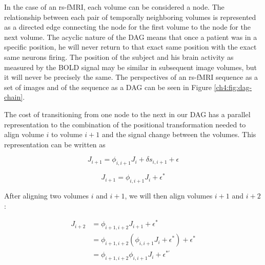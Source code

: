 In the case of an rs-fMRI, each volume can be considered a node. The relationship between each pair of temporally neighboring volumes is represented as a directed edge connecting the node for the first volume to the node for the next volume. The acyclic nature of the DAG means that once a patient was in a specific position, he will never return to that exact same position with the exact same neurons firing. The position of the subject and his brain activity as measured by the BOLD signal may be similar in subsequent image volumes, but it will never be precisely the same. The perspectives of an rs-fMRI sequence as a set of images and of the sequence as a DAG can be seen in Figure \ref{ch4:fig:dag-chain}.

The cost of transitioning from one node to the next in our DAG has a parallel representation to the combination of the positional transformation needed to align volume $i$ to volume $i+1$ and the signal change between the volumes. This representation can be written as 

\begin{equation}
J_{i+1} = \phi_{i,i+1} J_i + \delta s_{i,i+1} + \epsilon
\end{equation}


\begin{equation}
J_{i+1} = \phi_{i,i+1} J_i + \epsilon^*
\end{equation}


After aligning two volumes $i$ and $i+1$, we will then align volumes $i+1$ and $i+2$:

\begin{equation}
\begin{split}
J_{i+2} & = \phi_{i+1,i+2} J_{i+1} + \epsilon^* \\
& = \phi_{i+1,i+2} (\phi_{i,i+1} J_i + \epsilon^*) +\epsilon^*\\
& = \phi_{i+1,i+2} \phi_{i,i+1} J_i + \epsilon^{*'}\\
\end{split}
\end{equation}


